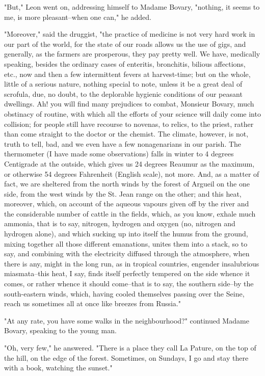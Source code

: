 \documentclass[11pt,twocolumn]{ltugboat}
\begin{document}
"But," Leon went on, addressing himself to Madame Bovary, "nothing, it
seems to me, is more pleasant--when one can," he added.

"Moreover," said the druggist, "the practice of medicine is not very
hard work in our part of the world, for the state of our roads allows us
the use of gigs, and generally, as the farmers are prosperous, they pay
pretty well. We have, medically speaking, besides the ordinary cases
of enteritis, bronchitis, bilious affections, etc., now and then a
few intermittent fevers at harvest-time; but on the whole, little of a
serious nature, nothing special to note, unless it be a great deal of
scrofula, due, no doubt, to the deplorable hygienic conditions of our
peasant dwellings. Ah! you will find many prejudices to combat, Monsieur
Bovary, much obstinacy of routine, with which all the efforts of your
science will daily come into collision; for people still have recourse
to novenas, to relics, to the priest, rather than come straight to the
doctor or the chemist. The climate, however, is not, truth to tell, bad,
and we even have a few nonagenarians in our parish. The thermometer (I
have made some observations) falls in winter to 4 degrees Centigrade
at the outside, which gives us 24 degrees Reaumur as the maximum, or
otherwise 54 degrees Fahrenheit (English scale), not more. And, as a
matter of fact, we are sheltered from the north winds by the forest of
Argueil on the one side, from the west winds by the St. Jean range on
the other; and this heat, moreover, which, on account of the aqueous
vapours given off by the river and the considerable number of cattle
in the fields, which, as you know, exhale much ammonia, that is to say,
nitrogen, hydrogen and oxygen (no, nitrogen and hydrogen alone), and
which sucking up into itself the humus from the ground, mixing together
all those different emanations, unites them into a stack, so to say,
and combining with the electricity diffused through the atmosphere, when
there is any, might in the long run, as in tropical countries, engender
insalubrious miasmata--this heat, I say, finds itself perfectly tempered
on the side whence it comes, or rather whence it should come--that is to
say, the southern side--by the south-eastern winds, which, having cooled
themselves passing over the Seine, reach us sometimes all at once like
breezes from Russia."

"At any rate, you have some walks in the neighbourhood?" continued
Madame Bovary, speaking to the young man.

"Oh, very few," he answered. "There is a place they call La Pature, on
the top of the hill, on the edge of the forest. Sometimes, on Sundays, I
go and stay there with a book, watching the sunset."
\end{document}
